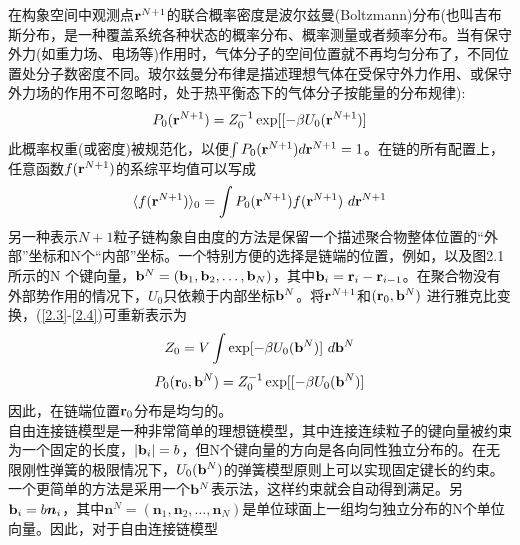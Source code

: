在构象空间中观测点$\mathbf{r}^{N+1}$的联合概率密度是波尔兹曼(Boltzmann)分布(也叫吉布斯分布，是一种覆盖系统各种状态的概率分布、概率测量或者频率分布。当有保守外力(如重力场、电场等)作用时，气体分子的空间位置就不再均匀分布了，不同位置处分子数密度不同。玻尔兹曼分布律是描述理想气体在受保守外力作用、或保守外力场的作用不可忽略时，处于热平衡态下的气体分子按能量的分布规律):\\
\begin{equation}
P_0(\mathbf{r}^{N+1})=Z_{0}^{-1} \exp[[-\beta U_{0}(\mathbf{r}^{N+1})]
\label{2.4}
\end{equation}
此概率权重(或密度)被规范化，以便$\int P_0(\mathbf{r}^{N+1}) d\mathbf{r}^{N+1}=1$。在链的所有配置上，任意函数$f(\mathbf{r}^{N+1})$的系综平均值可以写成\\
\begin{equation}
\langle f(\mathbf{r}^{N+1})\rangle _0 =  \int P_0(\mathbf{r}^{N+1})f(\mathbf{r}^{N+1})~d\mathbf{r}^{N+1}
\label{2.5}
\end{equation}
另一种表示$N+1$粒子链构象自由度的方法是保留一个描述聚合物整体位置的“外部”坐标和N个“内部”坐标。一个特别方便的选择是链端的位置，例如，以及图2.1所示的N 个键向量，$\mathbf{b}^{N}=(\mathbf{b}_1,\mathbf{b}_2,\ldots,\mathbf{b}_{N})$，其中$\mathbf{b}_{i}=\mathbf{r}_{i}-\mathbf{r}_{i-1}$。在聚合物没有外部势作用的情况下，$U_0$只依赖于内部坐标$\mathbf{b}^{N}$。将$\mathbf{r}^{N+1}$和$(\mathbf{r}_0,\mathbf{b}^{N})$ 进行雅克比变换，(\ref{2.3}-\ref{2.4})可重新表示为\\


\begin{equation}
Z_0 = V \int \exp[-\beta U_{0}(\mathbf{b}^{N})]~d\mathbf{b}^{N}
\label{2.6}
\end{equation}
\begin{equation}
P_0(\mathbf{r}_0,\mathbf{b}^{N})=Z_{0}^{-1} \exp[[-\beta U_{0}(\mathbf{b}^{N})]
\label{2.7}
\end{equation}
因此，在链端位置$\mathbf{r}_0$分布是均匀的。\\

自由连接链模型是一种非常简单的理想链模型，其中连接连续粒子的键向量被约束为一个固定的长度，$|\mathbf{b}_{i}|=b$，但N个键向量的方向是各向同性独立分布的。在无限刚性弹簧的极限情况下，$U_0(\mathbf{b}^{N})$的弹簧模型原则上可以实现固定键长的约束。一个更简单的方法是采用一个$\mathbf{b}^{N}$表示法，这样约束就会自动得到满足。另
$\mathbf{b}_{i}=b\bm{n}_{i}$，其中$\bm{n}^{N}=(\bm{n}_1,\bm{n}_2,\ldots,\bm{n}_{N})$是单位球面上一组均匀独立分布的N个单位向量。因此，对于自由连接链模型\\

